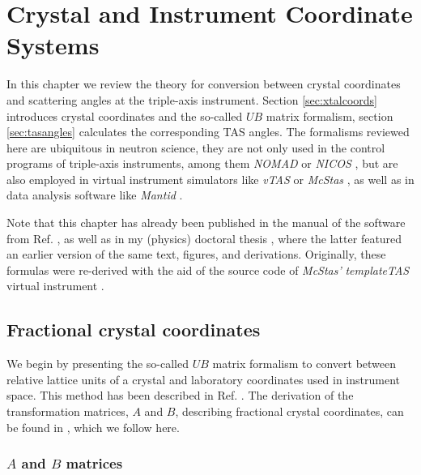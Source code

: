 %
%

\chapter{Crystal and Instrument Coordinate Systems}
\label{ch:xtal}

In this chapter we review the theory for conversion between crystal coordinates and scattering angles 
at the triple-axis instrument. Section \ref{sec:xtalcoords} introduces crystal coordinates and the so-called 
$UB$ matrix formalism, section \ref{sec:tasangles} calculates the corresponding TAS angles. 
The formalisms \cite{Lumsden2005} reviewed here are ubiquitous in neutron science, they are not only used 
in the control programs of triple-axis instruments, among them \textit{NOMAD} \cite{Mutti2011, web_NOMAD} 
or \textit{NICOS} \cite{web_NICOS}, but are also employed in virtual instrument simulators like \textit{vTAS} \cite{vTAS2013} or 
\textit{McStas} \cite{McStas2020}, as well as in data analysis software like \textit{Mantid} \cite{Arnold2014}.

Note that this chapter has already been published in the manual of the software from Ref. \cite{Takin2021},
as well as in my (physics) doctoral thesis \cite[pp. 139-143]{PhDWeber},
where the latter featured an earlier version of the same text, figures, and derivations.
Originally, these formulas were re-derived with the aid of the source
code of \textit{McStas'} \textit{templateTAS} virtual instrument \cite{web_mcstas_templateTAS, McStas2020}.


\section{Fractional crystal coordinates \label{sec:xtalcoords}}

We begin by presenting the so-called $UB$ matrix formalism to convert between relative lattice units 
of a crystal and laboratory coordinates used in instrument space. This method has been described in 
Ref. \cite{Lumsden2005}. The derivation of the transformation matrices, $A$ and $B$, describing fractional
crystal coordinates, can be found in \cite{wiki_fractional}, which we follow here.

\subsection{$A$ and $B$ matrices}
